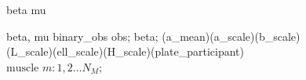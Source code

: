 \documentclass[a4paper,12pt]{article}
\begin{document}
\begin{figure}[H]
{        %
         {beta}
         {mu}

         {beta, mu}
         {binary_obs}
         {obs};
         {beta};
         {(a_mean)(a_scale)(b_scale)(L_scale)(ell_scale)(H_scale)(plate_participant)} {$\text{muscle }m : 1, 2 \ldots N_M$};
    }
\end{figure}
\end{document}
